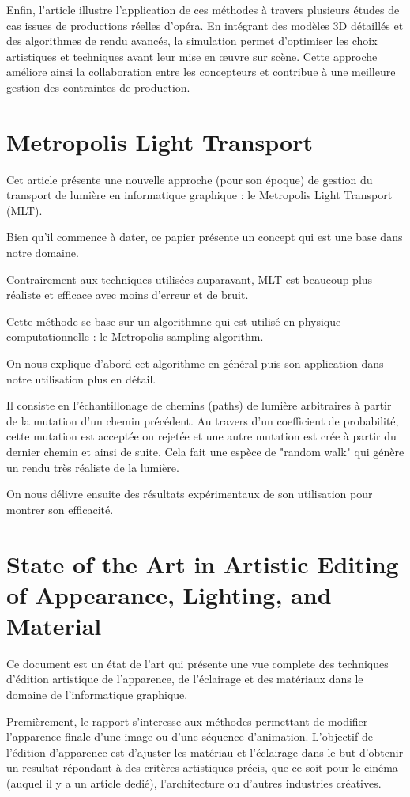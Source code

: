 \documentclass{article}
\begin{document}
Enfin, l’article illustre l’application de ces méthodes à travers plusieurs études de cas issues de productions réelles d’opéra. 
En intégrant des modèles 3D détaillés et des algorithmes de rendu avancés, la simulation permet d’optimiser les choix artistiques et techniques 
avant leur mise en œuvre sur scène. Cette approche améliore ainsi la collaboration entre les concepteurs et contribue à une meilleure gestion 
des contraintes de production.

\section{Metropolis Light Transport}

Cet article présente une nouvelle approche (pour son époque) de gestion du transport de lumière en informatique graphique : le Metropolis Light Transport (MLT). 

Bien qu'il commence à dater, ce papier présente un concept qui est une base dans notre domaine.

Contrairement aux techniques utilisées auparavant, MLT est beaucoup plus réaliste et efficace avec moins d'erreur et de bruit.

Cette méthode se base sur un algorithmne qui est utilisé en physique computationnelle : le Metropolis sampling algorithm.

On nous explique d'abord cet algorithme en général puis son application dans notre utilisation plus en détail.

Il consiste en l'échantillonage de chemins (paths) de lumière arbitraires à partir de la mutation d'un chemin précédent. Au travers d'un coefficient de probabilité, cette mutation est acceptée ou rejetée et une autre mutation est crée à partir du dernier chemin et ainsi de suite. Cela fait une espèce de "random walk" qui génère un rendu très réaliste de la lumière.

On nous délivre ensuite des résultats expérimentaux de son utilisation pour montrer son efficacité. 

\section{State of the Art in Artistic Editing of Appearance, Lighting, and Material}
Ce document est un état de l'art qui présente une vue complete des techniques d'édition artistique de l'apparence, de l'éclairage et des matériaux dans le domaine
de l'informatique graphique.

Premièrement, le rapport s'interesse aux méthodes permettant de modifier l'apparence finale d'une image ou d'une séquence d'animation.
L'objectif de l'édition d'apparence est d'ajuster les matériau et l'éclairage dans le but d'obtenir un resultat répondant à des critères artistiques
précis, que ce soit pour le cinéma (auquel il y a un article dedié), l'architecture ou d'autres industries créatives.
\end{document}
